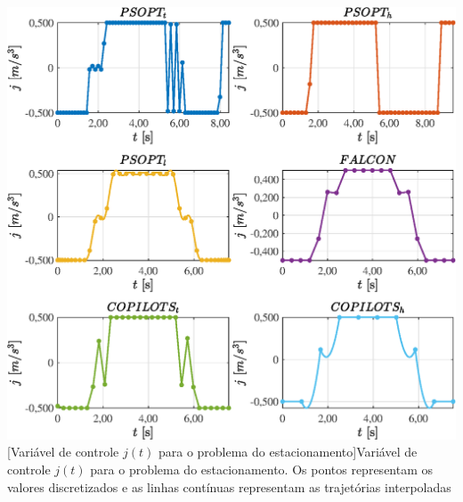 \noindent
\begin{minipage}{\textwidth}
	\vspace{\onelineskip}
	\centering
	\includegraphics[scale=0.7]{fig/resultados/estacionamento/traj/u/j}
	[Variável de controle  $j(t)$ para o problema do estacionamento]{Variável de controle  $j(t)$ para o problema do estacionamento. Os pontos representam os valores discretizados e as linhas contínuas representam as trajetórias interpoladas}
	\label{fig:estacionamento:u:j}
	\vspace{\onelineskip}
\end{minipage}

